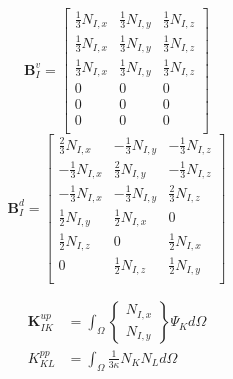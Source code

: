 
\begin{equation}
\boldsymbol B^v_I =
\begin{bmatrix}
    \frac{1}{3}N_{I,x} & \frac{1}{3}N_{I,y} & \frac{1}{3}N_{I,z} \\
    \frac{1}{3}N_{I,x} & \frac{1}{3}N_{I,y} & \frac{1}{3}N_{I,z} \\
    \frac{1}{3}N_{I,x} & \frac{1}{3}N_{I,y} & \frac{1}{3}N_{I,z} \\
    0 & 0 & 0 \\
    0 & 0 & 0 \\
    0 & 0 & 0 \\
\end{bmatrix}
\end{equation}
\begin{equation}
\boldsymbol B^d_I = 
\begin{bmatrix}
     \frac{2}{3}N_{I,x} & -\frac{1}{3}N_{I,y} & -\frac{1}{3}N_{I,z} \\
    -\frac{1}{3}N_{I,x} &  \frac{2}{3}N_{I,y} & -\frac{1}{3}N_{I,z} \\
    -\frac{1}{3}N_{I,x} & -\frac{1}{3}N_{I,y} &  \frac{2}{3}N_{I,z} \\
     \frac{1}{2}N_{I,y} &  \frac{1}{2}N_{I,x} & 0 \\
     \frac{1}{2}N_{I,z} & 0                   &  \frac{1}{2}N_{I,x} \\
    0                   &  \frac{1}{2}N_{I,z} &  \frac{1}{2}N_{I,y} \\
\end{bmatrix}
\end{equation}

\begin{align}
    \boldsymbol K^{up}_{IK} &= \int_{\Omega} 
    \begin{Bmatrix}
    N_{I,x} \\ N_{I,y}
    \end{Bmatrix} \Psi_K d\Omega \\
    K^{pp}_{KL} &= \int_\Omega\frac{1}{3\kappa} N_K N_L d\Omega
\end{align}
